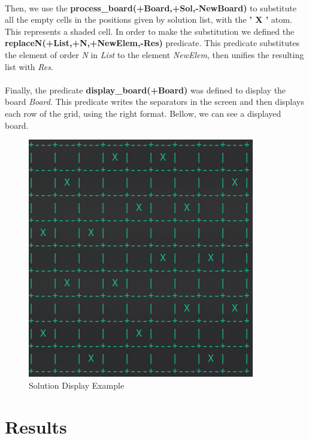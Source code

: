 \documentclass[runningheads]{llncs}
\begin{document}
\paragraph{}
Then, we use the \textbf{process\_board(+Board,+Sol,-NewBoard)} to substitute all the empty cells in the positions given
by solution list, with the \textbf{' X '} atom.
This represents a shaded cell. In order to make the substitution we defined
the \textbf{replaceN(+List,+N,+NewElem,-Res)} predicate. This predicate substitutes the element of order \textit{N} in
\textit{List} to the element \textit{NewElem}, then unifies the resulting list with \textit{Res}.

\paragraph{}
Finally, the predicate \textbf{display\_board(+Board)} was defined to display the board \textit{Board}. This predicate
writes the separators in the screen and then displays each row of the grid, using the right format. Bellow, we can see a
displayed board.

\begin{figure}
    \begin{center}
        \includegraphics[scale=0.5]{images/fig2.png}
        \caption{Solution Display Example} \label{fig2}
    \end{center}
\end{figure}


\section{Results}
\end{document}
